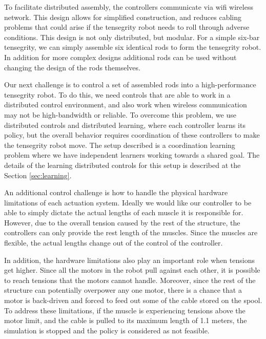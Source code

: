 \documentclass[twocolumn,10pt]{asme2ej}
\begin{document}
To facilitate distributed assembly, the controllers communicate via wifi wireless network. This design allows for simplified construction, and reduces cabling problems that could arise if the tensegrity robot needs to roll through adverse conditions. This design is not only distributed, but modular. For a simple six-bar tensegrity, we can simply assemble six identical rods to form the tensegrity robot. In addition for more complex designs additional rods can be used without changing the design of the rods themselves.

Our next challenge is to control a set of assembled rods into a high-performance tensegrity robot. To do this, we need controls that are able to work in a distributed control environment, and also work when wireless communication may not be high-bandwidth or reliable. To overcome this problem, we use distributed controls and distributed learning, where each controller learns its policy, but the overall behavior requires coordination of these controllers to make the tensegrity robot move. The setup described is a coordination learning problem where we have independent learners working towards a shared goal. The details of the learning distributed controls for this setup is described at the Section \ref{sec:learning}.

An additional control challenge is how to handle the physical hardware limitations of each actuation system. Ideally we would like our controller to be able to simply dictate the actual lengths of each muscle it is responsible for. However, due to the overall tension caused by the rest of the structure, the controllers can only provide the rest length of the muscles.  Since the muscles are flexible, the actual lengths change out of the control of the controller. 

In addition, the hardware limitations also play an important role when tensions get higher. Since all the motors in the robot pull against each other, it is possible to reach tensions that the motors cannot handle. Moreover, since the rest of the structure can potentially overpower any one motor, there  is a chance that a motor is back-driven and forced to feed out some of the cable stored on the spool. To address these limitations, if the muscle is experiencing tensions above the motor limit, and the cable is pulled to its maximum length of 1.1 meters, the simulation is stopped and the policy is considered as not feasible.
\end{document}
